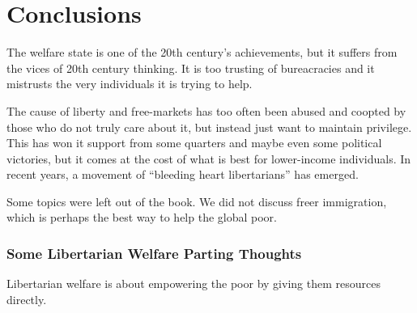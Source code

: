 \chapter{Conclusions}

The welfare state is one of the 20th century's achievements, but it suffers
from the vices of 20th century thinking. It is too trusting of bureacracies and
it mistrusts the very individuals it is trying to help.

The cause of liberty and free-markets has too often been abused and coopted by
those who do not truly care about it, but instead just want to maintain
privilege. This has won it support from some quarters and maybe even some
political victories, but it comes at the cost of what is best for lower-income
individuals. In recent years, a movement of ``bleeding heart libertarians'' has
emerged.

Some topics were left out of the book. We did not discuss freer immigration,
which is perhaps the best way to help the global poor.

\subsection{Some Libertarian Welfare Parting Thoughts}

\thought Libertarian welfare is about empowering the poor by giving them
resources directly.

